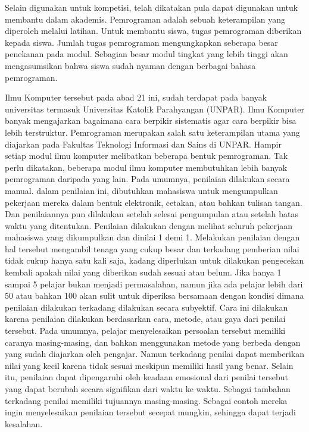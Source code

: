 \documentclass[a4paper,twoside]{article}
\begin{document}
Selain digunakan untuk kompetisi, telah dikatakan pula dapat digunakan untuk membantu dalam akademis. Pemrograman adalah sebuah keterampilan yang diperoleh melalui latihan. Untuk membantu siswa, tugas pemrograman diberikan kepada siswa. Jumlah tugas pemrograman mengungkapkan seberapa besar penekanan pada modul. Sebagian besar modul tingkat yang lebih tinggi akan mengasumsikan bahwa siswa sudah nyaman dengan berbagai bahasa pemrograman.

Ilmu Komputer tersebut pada abad 21 ini, sudah terdapat pada banyak universitas termasuk Universitas Katolik Parahyangan (UNPAR). Ilmu Komputer banyak mengajarkan bagaimana cara berpikir sistematis agar cara berpikir bisa lebih terstruktur. Pemrograman merupakan salah satu keterampilan utama yang diajarkan pada Fakultas Teknologi Informasi dan Sains di UNPAR. Hampir setiap modul ilmu komputer melibatkan beberapa bentuk pemrograman. Tak perlu dikatakan, beberapa modul ilmu komputer membutuhkan lebih banyak pemrograman daripada yang lain. Pada umumnya, penilaian dilakukan secara manual. dalam penilaian ini, dibutuhkan mahasiswa untuk mengumpulkan pekerjaan mereka dalam bentuk elektronik, cetakan, atau bahkan tulisan tangan. Dan penilaiannya pun dilakukan setelah selesai pengumpulan atau setelah batas waktu yang ditentukan. Penilaian dilakukan dengan melihat seluruh pekerjaan mahasiswa yang dikumpulkan dan dinilai 1 demi 1. Melakukan penilaian dengan hal tersebut mengambil tenaga yang cukup besar dan terkadang pemberian nilai tidak cukup hanya satu kali saja, kadang diperlukan untuk dilakukan pengecekan kembali apakah nilai yang diberikan sudah sesuai atau belum. Jika hanya 1 sampai 5 pelajar bukan menjadi permasalahan, namun jika ada pelajar lebih dari 50 atau bahkan 100 akan sulit untuk diperiksa bersamaan dengan kondisi dimana penilaian dilakukan terkadang dilakukan secara subyektif. Cara ini dilakukan karena penilaian dilakukan berdasarkan cara, metode, atau gaya dari penilai tersebut. Pada umumnya, pelajar menyelesaikan persoalan tersebut memiliki caranya masing-masing, dan bahkan menggunakan metode yang berbeda dengan yang sudah diajarkan oleh pengajar. Namun terkadang penilai dapat memberikan nilai yang kecil karena tidak sesuai meskipun memiliki hasil yang benar. Selain itu, penilaian dapat dipengaruhi oleh keadaan emosional dari penilai tersebut yang dapat berubah secara signifikan dari waktu ke waktu. Sebagai tambahan terkadang penilai memiliki tujuannya masing-masing. Sebagai contoh mereka ingin menyelesaikan penilaian tersebut secepat mungkin, sehingga dapat terjadi kesalahan.
\end{document}
